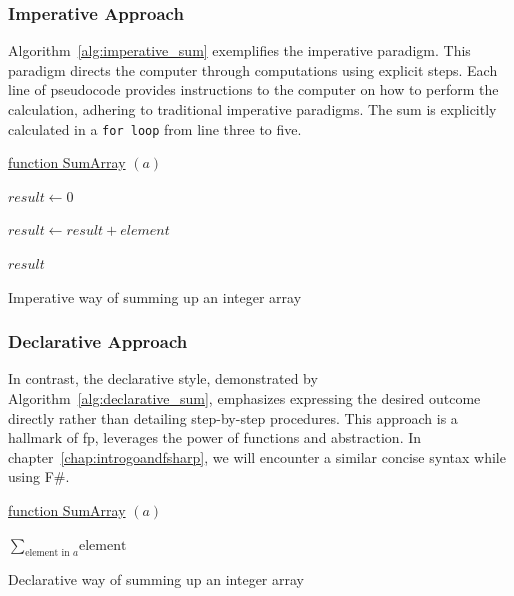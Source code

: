     \subsubsection{Imperative Approach}
    Algorithm\ \ref{alg:imperative_sum} exemplifies the imperative paradigm. This paradigm directs the computer through computations using explicit steps. Each line of pseudocode provides instructions to the computer on how to perform the calculation, adhering to traditional imperative paradigms. The sum is explicitly calculated in a \texttt{for loop} from line three to five.

\begin{algorithm}

    \underline{function SumArray} $(a)$\;
    
    \BlankLine
    $result \leftarrow 0$
    
    {
        $result \leftarrow result + element$
    }
    
    \Return $result$
    
    \caption{Imperative way of summing up an integer array}\label{alg:imperative_sum}
\end{algorithm}

\subsubsection{Declarative Approach}

In contrast, the declarative style, demonstrated by Algorithm\ \ref{alg:declarative_sum}, emphasizes expressing the desired outcome directly rather than detailing step-by-step procedures. This approach is a hallmark of \ac{fp}, leverages the power of functions and abstraction. In chapter\ \ref{chap:introgoandfsharp}, we will encounter a similar concise syntax while using F\#.

\begin{algorithm}

    \underline{function SumArray} $(a)$\;
    
    \BlankLine
    \Return $\sum_{\text{element in } a} \text{element}$
    
    \caption{Declarative way of summing up an integer array}\label{alg:declarative_sum}
\end{algorithm}


